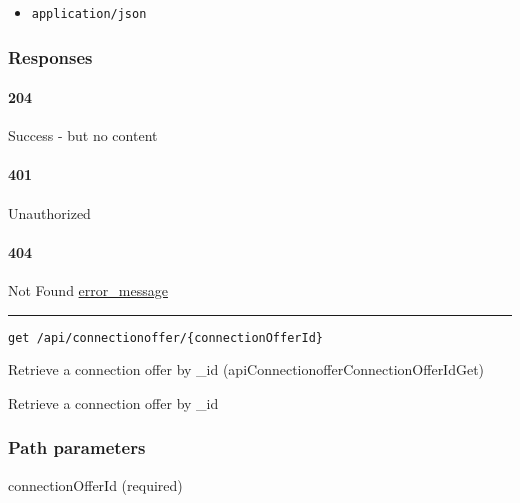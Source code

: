 \begin{itemize}
\tightlist
\item
  \texttt{application/json}
\end{itemize}

\hypertarget{responses-155}{%
\subsubsection{Responses}\label{responses-155}}

\hypertarget{section-499}{%
\paragraph{204}\label{section-499}}

Success - but no content \protect\hyperlink{}{}

\hypertarget{section-500}{%
\paragraph{401}\label{section-500}}

Unauthorized \protect\hyperlink{}{}

\hypertarget{section-501}{%
\paragraph{404}\label{section-501}}

Not Found \protect\hyperlink{error_message}{error\_message}

\begin{center}\rule{0.5\linewidth}{\linethickness}\end{center}

\protect\hypertarget{apiConnectionofferConnectionOfferIdGet}{}{}

\begin{verbatim}
get /api/connectionoffer/{connectionOfferId}
\end{verbatim}

Retrieve a connection offer by \_id
({apiConnectionofferConnectionOfferIdGet})

Retrieve a connection offer by \_id

\hypertarget{path-parameters-85}{%
\subsubsection{Path parameters}\label{path-parameters-85}}

connectionOfferId (required)

